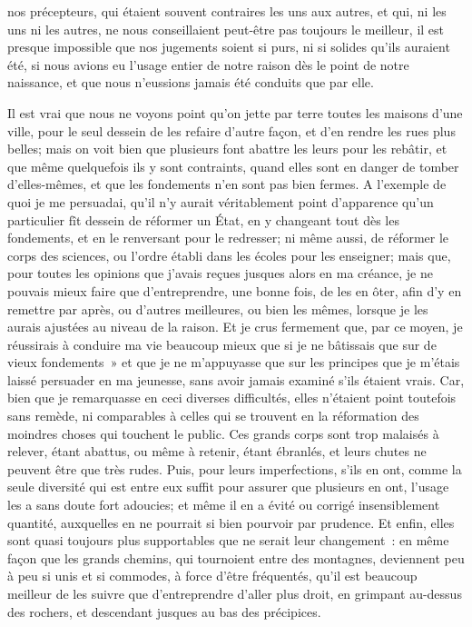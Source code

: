 \documentclass[french,twoside]{book} %
\begin{document}
nos précepteurs, qui étaient souvent contraires les uns aux autres, et qui, ni les uns ni les autres, ne nous conseillaient peut-être pas toujours le meilleur, il est presque impossible que nos jugements soient si purs, ni si solides qu'ils auraient été, si nous avions eu l'usage entier de notre raison dès le point de notre naissance, et que nous n'eussions jamais été conduits que par elle.\par
Il est vrai que nous ne voyons point qu'on jette par terre toutes les maisons d'une ville, pour le seul dessein de les refaire d'autre façon, et d'en rendre les rues plus belles; mais on voit bien que plusieurs font abattre les leurs pour les rebâtir, et que même quelquefois ils y sont contraints, quand elles sont en danger de tomber d'elles-mêmes, et que les fondements n'en sont pas bien fermes. A l'exemple de quoi je me persuadai, qu'il n'y aurait véritablement point d'apparence qu'un particulier fît dessein de réformer un État, en y changeant tout dès les fondements, et en le renversant pour le redresser; ni même aussi, de réformer le corps des sciences, ou l'ordre établi dans les écoles pour les enseigner; mais que, pour toutes les opinions que j'avais reçues jusques alors en ma créance, je ne pouvais mieux faire que d'entreprendre, une bonne fois, de les en ôter, afin d'y en remettre par après, ou d'autres meilleures, ou bien les mêmes, lorsque je les aurais ajustées au niveau de la raison. Et je crus fermement que, par ce moyen, je réussirais à conduire ma vie beaucoup mieux que si je ne bâtissais que sur de vieux fondements » et que je ne m'appuyasse que sur les principes que je m'étais laissé persuader en ma jeunesse, sans avoir jamais examiné s'ils étaient vrais. Car, bien que je remarquasse en ceci diverses difficultés, elles n'étaient point toutefois sans remède, ni comparables à celles qui se trouvent en la réformation des moindres choses qui touchent le public. Ces grands corps sont trop malaisés à relever, étant abattus, ou même à retenir, étant ébranlés, et leurs chutes ne peuvent être que très rudes. Puis, pour leurs imperfections, s'ils en ont, comme la seule diversité qui est entre eux suffit pour assurer que plusieurs en ont, l'usage les a sans doute fort adoucies; et même il en a évité ou corrigé insensiblement quantité, auxquelles en ne pourrait si bien pourvoir par prudence. Et enfin, elles sont quasi toujours plus supportables que ne serait leur changement : en même façon que les grands chemins, qui tournoient entre des montagnes, deviennent peu à peu si unis et si commodes, à force d'être fréquentés, qu'il est beaucoup meilleur de les suivre que d'entreprendre d'aller plus droit, en grimpant au-dessus des rochers, et descendant jusques au bas des précipices.\par
\end{document}
